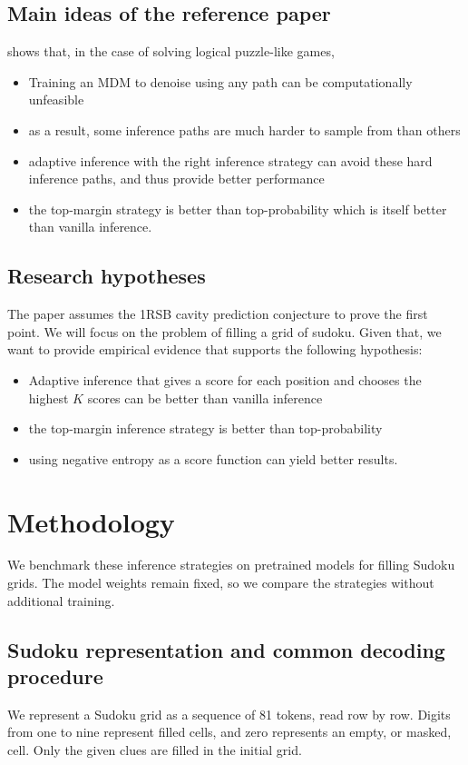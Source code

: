 \documentclass{article}
\begin{document}
\subsection{Main ideas of the reference paper}
\citet{kim2025trainworstplanbest} shows that, in the case of solving logical puzzle-like games,
\begin{itemize}
    \item Training an MDM to denoise using any path can be computationally unfeasible
    \item as a result, some inference paths are much harder to sample from than others
    \item adaptive inference with the right inference strategy can avoid these hard inference paths, and thus provide better performance
    \item the top-margin strategy is better than top-probability which is itself better than vanilla inference.
\end{itemize}

\subsection{Research hypotheses}
The paper assumes the 1RSB cavity prediction conjecture to prove the first point.
We will focus on the problem of filling a grid of sudoku.
Given that, we want to provide empirical evidence that supports the following hypothesis:
\begin{itemize}
    \item Adaptive inference that gives a score for each position and chooses the highest $K$ scores can be better than vanilla inference
    \item the top-margin inference strategy is better than top-probability
    \item using negative entropy as a score function can yield better results.
\end{itemize}

\section{Methodology}
\label{sec:methodology}

We benchmark these inference strategies on pretrained models for filling
Sudoku grids. The model weights remain fixed, so we compare the strategies
without additional training.

\subsection{Sudoku representation and common decoding procedure}
We represent a Sudoku grid as a sequence of 81 tokens, read row by row.
Digits from one to nine represent filled cells, and zero represents an empty,
or masked, cell. Only the given clues are filled in the initial grid.
\end{document}
